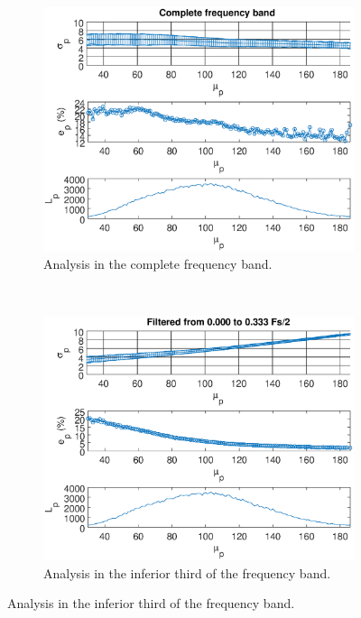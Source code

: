 \documentclass[review]{elsarticle}
\begin{document}
\begin{figure}[h!]
    \centering
    \begin{subfigure}[b]{0.475\textwidth}
        \includegraphics[width=\textwidth]{stdall_curve.eps}
	\caption{Analysis in the complete frequency band.}
        \label{fig:illlevel_all}
    \end{subfigure}
    ~
    \begin{subfigure}[b]{0.475\textwidth}
        \includegraphics[width=\textwidth]{stdx_curve.eps}
	\caption{Analysis in the inferior third of the frequency band.}
        \label{fig:illlevel_stdx}
    \end{subfigure}

\end{figure}
\end{document}
